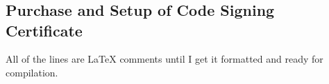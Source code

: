 \chapter{\cspszerotitle{}}

\label{csps0}

\section{Purchase and Setup of Code Signing Certificate}
\label{csps0:spsc0}

All of the lines are \LaTeX{} comments until I get it formatted and
ready for compilation.

% 
% 
% 
% 
%
%
%
%
%
%
%
%
%
%


